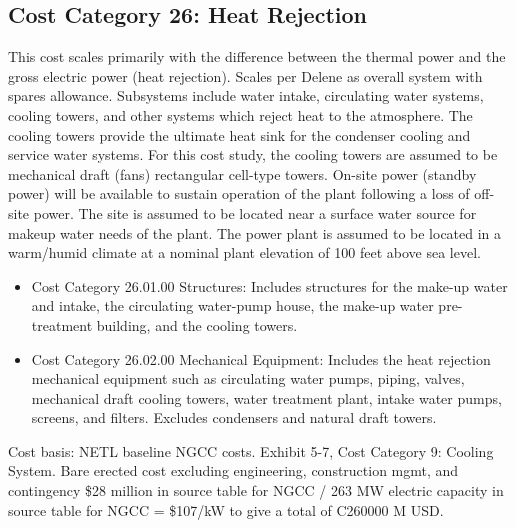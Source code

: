 
\subsection{Cost Category 26: Heat Rejection}

This cost scales primarily with the difference between the thermal power and the gross electric power (heat rejection). Scales per Delene as overall system with spares allowance.  Subsystems include water intake, circulating water systems, cooling towers, and other systems which reject heat to the atmosphere. The cooling towers provide the ultimate heat sink for the condenser cooling and service water systems.  For this cost study, the cooling towers are assumed to be mechanical draft (fans) rectangular cell-type towers.  On-site power (standby power) will be available to sustain operation of the plant following a loss of off-site power. The site is assumed to be located near a surface water source for makeup water needs of the plant.  The power plant is assumed to be located in a warm/humid climate at a nominal plant elevation of 100 feet above sea level.

\begin{itemize}
    \item Cost Category 26.01.00 Structures: Includes structures for the make-up water and intake, the circulating water-pump house, the make-up water pre-treatment building, and the cooling towers.
    \item Cost Category 26.02.00 Mechanical Equipment: Includes the heat rejection mechanical equipment such as circulating water pumps, piping, valves, mechanical draft cooling towers, water treatment plant, intake water pumps, screens, and filters. Excludes condensers and natural draft towers.
\end{itemize}

Cost basis: NETL baseline NGCC costs. Exhibit 5-7, Cost Category 9: Cooling System. Bare erected cost excluding engineering, construction mgmt, and contingency \$28 million in source table for NGCC / 263 MW electric capacity in source table for NGCC = \$107/kW to give a total of C260000 M USD.










